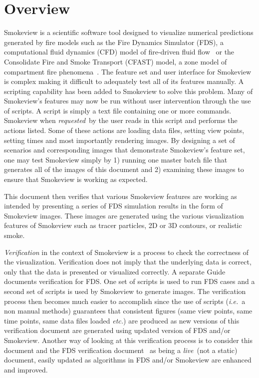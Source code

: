 \documentclass[11pt,twoside]{book}
\begin{document}
\chapter{Overview}
Smokeview is a scientific software tool designed to visualize numerical
predictions generated by fire models such as the Fire Dynamics Simulator (FDS),
a computational fluid dynamics (CFD) model of fire-driven fluid
flow~\cite{FDS_Math_Guide_5,FDS_Users_Guide_5} or the Consolidate Fire and Smoke Transport (CFAST) model, a zone model of compartment fire phenomena~\cite{Jones:2004A}.
The feature set and user interface for Smokeview is complex making it difficult to adequately test all of its features manually.  A scripting capability has been added to Smokeview to solve this problem.  Many of Smokeview's features may now be run without user intervention through the use of scripts.  A script is simply a text file containing one or more commands.  Smokeview when {\em requested}\ by the user reads in this script and performs the actions listed.  Some of these actions are loading data files, setting view points, setting times and most importantly rendering images.  By designing a set of scenarios and corresponding images that demonstrate Smokeview's feature set, one may test Smokeview simply by 1) running one master batch file that generates all of the images of this document and 2) examining these images to ensure that Smokeview is working as expected.

This document then verifies that various Smokeview features are working as intended by presenting a series of  FDS simulation results in the form of Smokeview images.  These images are generated using the various visualization features of Smokeview such as tracer particles, 2D or 3D contours, or realistic smoke.

{\em Verification} in the context of Smokeview is a process to check the correctness
of the visualization.  Verification does not imply that the underlying data is correct, only
that the data is presented or visualized correctly.
A separate Guide~\cite{FDS_Verification_Guide_5} documents verification for FDS.  One set of scripts is used to run FDS cases and a second set of scripts is used by Smokeview to generate images.  The verification process then becomes much easier to accomplish since the use of scripts ({\em i.e.}\ a non manual methods) guarantees that consistent figures (same view points, same time points, same data files loaded {\em etc.}) are produced as new versions of this verification document are generated using updated version of FDS and/or Smokeview.  Another way of looking at this verification process is to
consider this document and the FDS verification document~\cite{FDS_Verification_Guide_5} as being a {\em live}\ (not a static) document, easily updated as algorithms in FDS and/or Smokeview are enhanced and improved.
\end{document}
